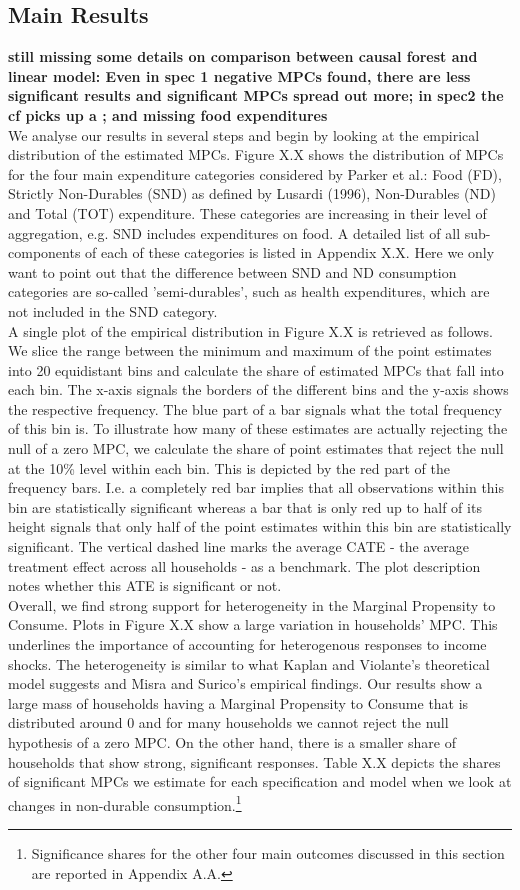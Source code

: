 \subsection{Main Results}
\textbf{still missing some details on comparison between causal forest and linear model: Even in spec 1 negative MPCs found, there are less significant results and significant MPCs spread out more; in spec2 the cf picks up a ; and missing food expenditures} \\
We analyse our results in several steps and begin by looking at the empirical distribution of the estimated MPCs. Figure X.X shows the distribution of MPCs for the four main expenditure categories considered by Parker et al.: Food (FD), Strictly Non-Durables (SND) as defined by Lusardi (1996), Non-Durables (ND) and Total (TOT) expenditure. These categories are increasing in their level of aggregation, e.g. SND includes expenditures on food. A detailed list of all sub-components of each of these categories is listed in Appendix X.X. Here we only want to point out that the difference between SND and ND consumption categories are so-called 'semi-durables', such as health expenditures, which are not included in the SND category. \\
A single plot of the empirical distribution in Figure X.X is retrieved as follows. We slice the range between the minimum and maximum of the point estimates into 20 equidistant bins and calculate the share of estimated MPCs that fall into each bin. The x-axis signals the borders of the different bins and the y-axis shows the respective frequency. The blue part of a bar signals what the total frequency of this bin is. To illustrate how many of these estimates are actually rejecting the null of a zero MPC, we calculate the share of point estimates that reject the null at the 10\% level within each bin. This is depicted by the red part of the frequency bars. I.e. a completely red bar implies that all observations within this bin are statistically significant whereas a bar that is only red up to half of its height signals that only half of the point estimates within this bin are statistically significant. The vertical dashed line marks the average CATE - the average treatment effect across all households - as a benchmark. The plot description notes whether this ATE is significant or not. \\ 
Overall, we find strong support for heterogeneity in the Marginal Propensity to Consume. Plots in Figure X.X show a large variation in households' MPC. This underlines the importance of accounting for heterogenous responses to income shocks. The heterogeneity is similar to what Kaplan and Violante's theoretical model suggests and Misra and Surico's empirical findings. Our results show a large mass of households having a Marginal Propensity to Consume that is distributed around 0 and for many households we cannot reject the null hypothesis of a zero MPC. On the other hand, there is a smaller share of households that show strong, significant responses. Table X.X depicts the shares of significant MPCs we estimate for each specification and model when we look at changes in non-durable consumption.\footnote{Significance shares for the other four main outcomes discussed in this section are reported in Appendix A.A.} \\
